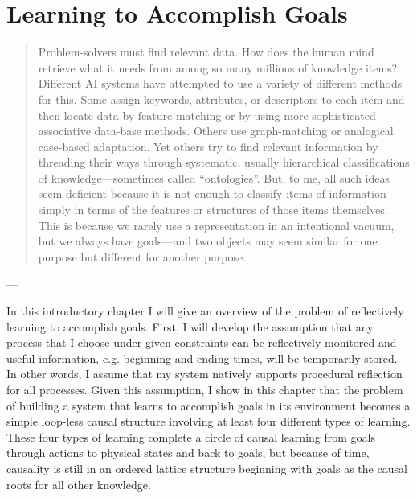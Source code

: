 \chapter{Learning to Accomplish Goals}\label{ch:learning_to_accomplish_goals}

\begin{quote}
  Problem-solvers must find relevant data.  How does the human mind
  retrieve what it needs from among so many millions of knowledge items?
  Different AI systems have attempted to use a variety of different
  methods for this.  Some assign keywords, attributes, or descriptors to
  each item and then locate data by feature-matching or by using more
  sophisticated associative data-base methods.  Others use
  graph-matching or analogical case-based adaptation.  Yet others try to
  find relevant information by threading their ways through systematic,
  usually hierarchical classifications of knowledge---sometimes called
  ``ontologies''.  But, to me, all such ideas seem deficient because it
  is not enough to classify items of information simply in terms of the
  features or structures of those items themselves.  This is because we
  rarely use a representation in an intentional vacuum, but we always
  have goals---and two objects may seem similar for one purpose but
  different for another purpose.
\end{quote}
\begin{flushright}
  --- 
\end{flushright}

%
%


In this introductory chapter I will give an overview of the problem of
reflectively learning to accomplish goals.  First, I will develop the
assumption that any process that I choose under given constraints can
be reflectively monitored and useful information, e.g. beginning and
ending times, will be temporarily stored.  In other words, I assume
that my system natively supports procedural reflection for all
processes.  Given this assumption, I show in this chapter that the
problem of building a system that learns to accomplish goals in its
environment becomes a simple loop-less causal structure involving at
least four different types of learning.  These four types of learning
complete a circle of causal learning from goals through actions to
physical states and back to goals, but because of time, causality is
still in an ordered lattice structure beginning with goals as the
causal roots for all other knowledge.

